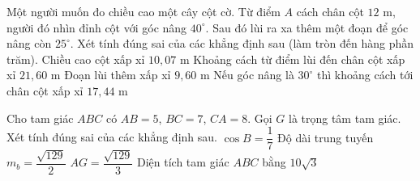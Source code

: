 \begin{ex}%
	Một người muốn đo chiều cao một cây cột cờ. Từ điểm $A$ cách chân cột $12$ m, người đó nhìn đỉnh cột với góc nâng $40^\circ$. Sau đó lùi ra xa thêm một đoạn để góc nâng còn $25^\circ$. Xét tính đúng sai của các khẳng định sau (làm tròn đến hàng phần trăm).
	\choiceTF
		{\True Chiều cao cột xấp xỉ $10{,}07$ m}
		{\True Khoảng cách từ điểm lùi đến chân cột xấp xỉ $21{,}60$ m}
		{\True Đoạn lùi thêm xấp xỉ $9{,}60$ m}
		{Nếu góc nâng là $30^\circ$ thì khoảng cách tới chân cột xấp xỉ $17{,}44$ m}
\end{ex}

\begin{ex}%
	Cho tam giác $ABC$ có $AB=5$, $BC=7$, $CA=8$. Gọi $G$ là trọng tâm tam giác. Xét tính đúng sai của các khẳng định sau.
	\choiceTF
		{\True $\cos B=\dfrac{1}{7}$}
		{\True Độ dài trung tuyến $m_b=\dfrac{\sqrt{129}}{2}$}
		{\True $AG=\dfrac{\sqrt{129}}{3}$}
		{Diện tích tam giác $ABC$ bằng $10\sqrt3$}
\end{ex}

